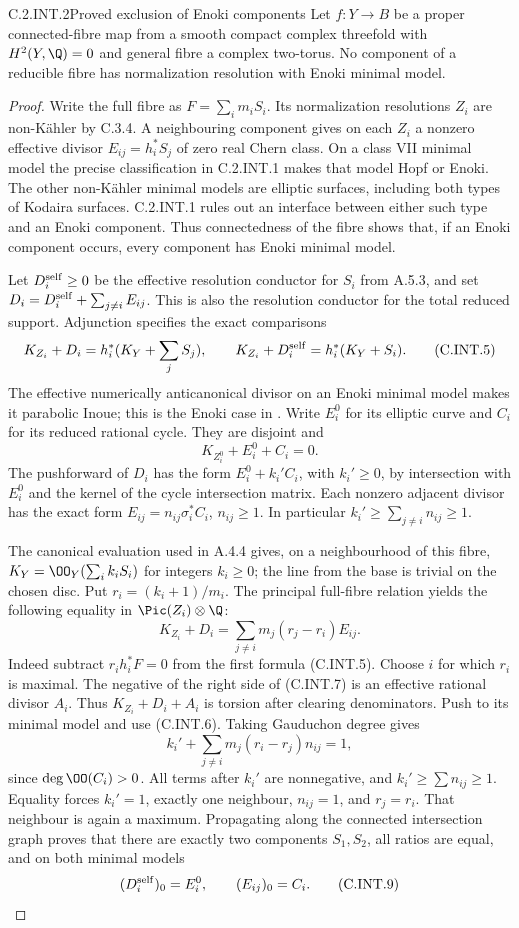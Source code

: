 \begin{idstatement}{C.2.INT.2}{Proved exclusion of Enoki components}
\label{st:C.2.INT.2}
Let $f:Y\to B$ be a proper connected-fibre map from a
smooth compact complex threefold with $H^2(Y,\Q)=0$
and general fibre a complex two-torus. No component
of a reducible fibre has normalization resolution
with Enoki minimal model.
\end{idstatement}
\begin{proof}
Write the full fibre as $F=\sum_i m_iS_i$. Its
normalization resolutions $Z_i$ are non-K\"ahler by
C.3.4. A neighbouring component gives on each $Z_i$
a nonzero effective divisor $E_{ij}=h_i^*S_j$ of
zero real Chern class. On a class VII minimal model
the precise classification in C.2.INT.1 makes that
model Hopf or Enoki. The other non-K\"ahler minimal
models are elliptic surfaces, including both types
of Kodaira surfaces. C.2.INT.1 rules out an interface
between either such type and an Enoki component.
Thus connectedness of the fibre shows that, if an
Enoki component occurs, every component has Enoki
minimal model.

Let $D_i^{\rm self}\ge0$ be the effective resolution
conductor for $S_i$ from A.5.3, and set
$D_i=D_i^{\rm self}+\sum_{j\ne i}E_{ij}$. This is
also the resolution conductor for the total reduced
support. Adjunction specifies the exact comparisons
\[
 K_{Z_i}+D_i=h_i^*(K_Y+\sum_j S_j),\qquad
 K_{Z_i}+D_i^{\rm self}=h_i^*(K_Y+S_i).
 \tag{C.INT.5}
\]
The effective numerically anticanonical divisor on
an Enoki minimal model makes it parabolic Inoue;
this is the Enoki case in
\cite[Lemma~2.22 and the following paragraph]{Dloussky2006}.
Write $E_i^0$ for its elliptic curve and $C_i$ for
its reduced rational cycle. They are disjoint and
\[
 K_{Z_i^0}+E_i^0+C_i=0.
 \tag{C.INT.6}
\]
The pushforward of $D_i$ has the form
$E_i^0+k_i' C_i$, with $k_i'\ge0$, by intersection
with $E_i^0$ and the kernel of the cycle intersection
matrix. Each nonzero adjacent divisor has the exact
form $E_{ij}=n_{ij}\sigma_i^*C_i$, $n_{ij}\ge1$.
In particular $k_i'\ge\sum_{j\ne i}n_{ij}\ge1$.

The canonical evaluation used in A.4.4 gives, on a
neighbourhood of this fibre,
$K_Y=\OO_Y(\sum_i k_iS_i)$ for integers $k_i\ge0$;
the line from the base is trivial on the chosen disc.
Put $r_i=(k_i+1)/m_i$. The principal full-fibre
relation yields the following equality in
$\Pic(Z_i)\otimes\Q$:
\[
 K_{Z_i}+D_i
   =\sum_{j\ne i}m_j(r_j-r_i)E_{ij}.
 \tag{C.INT.7}
\]
Indeed subtract $r_i h_i^*F=0$ from the first
formula (C.INT.5). Choose $i$ for which $r_i$ is
maximal. The negative of the right side of
(C.INT.7) is an effective rational divisor $A_i$.
Thus $K_{Z_i}+D_i+A_i$ is torsion after clearing
denominators. Push to its minimal model and use
(C.INT.6). Taking Gauduchon degree gives
\[
 k_i'+\sum_{j\ne i}m_j(r_i-r_j)n_{ij}=1,
 \tag{C.INT.8}
\]
since $\deg\OO(C_i)>0$. All terms after $k_i'$
are nonnegative, and $k_i'\ge\sum n_{ij}\ge1$.
Equality forces $k_i'=1$, exactly one neighbour,
$n_{ij}=1$, and $r_j=r_i$. That neighbour is again
a maximum. Propagating along the connected
intersection graph proves that there are exactly
two components $S_1,S_2$, all ratios are equal,
and on both minimal models
\[
 (D_i^{\rm self})_0=E_i^0,
 \qquad (E_{ij})_0=C_i.
 \tag{C.INT.9}
\]


\end{proof}
